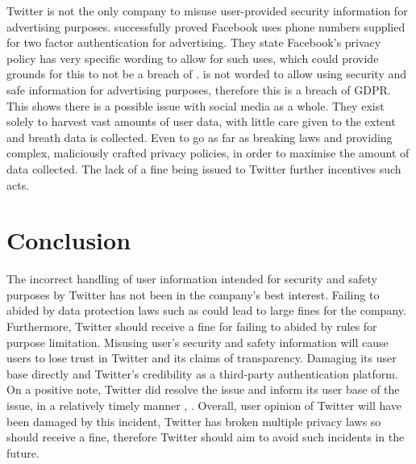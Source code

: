 \documentclass[a4paper, 11pt]{article}
\begin{document}
Twitter is not the only company to misuse user-provided security information for advertising purposes.
\textcite{venkatadri2019investigating} successfully proved Facebook uses phone numbers supplied for two factor authentication for advertising.
They state Facebook's privacy policy has very specific wording to allow for such uses, which could provide grounds for this to not be a breach of \textcite{_regulation_2016}.
\textcite{twitter_privacy_2018} is not worded to allow using security and safe information for advertising purposes, therefore this is a breach of GDPR.
This shows there is a possible issue with social media as a whole.
They exist solely to harvest vast amounts of user data, with little care given to the extent and breath data is collected.
Even to go as far as breaking laws and providing complex, maliciously crafted privacy policies, in order to maximise the amount of data collected.
The lack of a fine being issued to Twitter further incentives such acts.

\section{Conclusion}
The incorrect handling of user information intended for security and safety purposes by Twitter has not been in the company's best interest.
Failing to abided by data protection laws such as \textcite{_regulation_2016} could lead to large fines for the company.
Furthermore, Twitter should receive a fine for failing to abided by rules for purpose limitation.
Misusing user's security and safety information will cause users to lose trust in Twitter and its claims of transparency.
Damaging its user base directly and Twitter's credibility as a third-party authentication platform.
On a positive note, Twitter did resolve the issue and inform its user base of the issue, in a relatively timely manner \parencite{support_personal_2019}, \parencite{support_twitter_2019}.
Overall, user opinion of Twitter will have been damaged by this incident, Twitter has broken multiple privacy laws so should receive a fine, therefore Twitter should aim to avoid such incidents in the future.

\printbibliography
\end{document}
